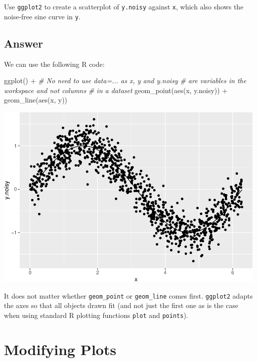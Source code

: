 \documentclass[
]{book}
\newenvironment{Shaded}{\begin{snugshade}}{\end{snugshade}}
\newcommand{\CommentTok}[1]{\textcolor[rgb]{0.56,0.35,0.01}{\textit{#1}}}
\newcommand{\FunctionTok}[1]{\textcolor[rgb]{0.00,0.00,0.00}{#1}}
\newcommand{\NormalTok}[1]{#1}
\newcommand{\SpecialCharTok}[1]{\textcolor[rgb]{0.00,0.00,0.00}{#1}}
\begin{document}
Use \texttt{ggplot2} to create a scatterplot of \texttt{y.noisy} against \texttt{x}, which also shows the noise-free sine curve in \texttt{y}.

\hypertarget{answer-6}{%
\subsection{Answer}\label{answer-6}}

We can use the following R code:

\begin{Shaded}
\begin{Highlighting}[]
\FunctionTok{ggplot}\NormalTok{() }\SpecialCharTok{+}                               \CommentTok{\# No need to use data=... as x, y and y.noisy}
                                         \CommentTok{\# are variables in the workspace and not columns}
                                         \CommentTok{\# in a dataset}
    \FunctionTok{geom\_point}\NormalTok{(}\FunctionTok{aes}\NormalTok{(x, y.noisy)) }\SpecialCharTok{+}
    \FunctionTok{geom\_line}\NormalTok{(}\FunctionTok{aes}\NormalTok{(x, y))}
\end{Highlighting}
\end{Shaded}

\includegraphics{bookdown-demo_files/figure-latex/unnamed-chunk-59-1.pdf}

It does not matter whether \texttt{geom\_point} or \texttt{geom\_line} comes first. \texttt{ggplot2} adapts the axes so that all objects drawn fit (and not just the first one as is the case when using standard R plotting functions \texttt{plot} and \texttt{points}).

\hypertarget{modifying-plots}{%
\section{Modifying Plots}\label{modifying-plots}}
\end{document}
